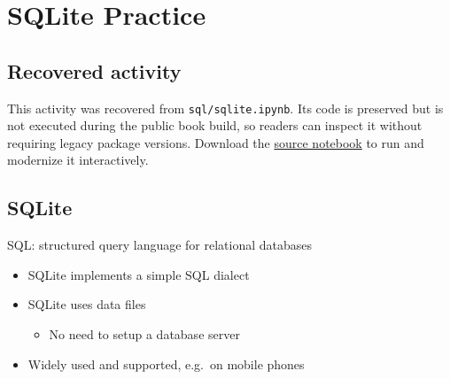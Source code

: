 \documentclass[
  letterpaper,
]{scrbook}
\providecommand{\tightlist}{%
  \setlength{\itemsep}{0pt}\setlength{\parskip}{0pt}}
\begin{document}
\chapter*{SQLite Practice}\label{ch-lab-sqlite}


\section*{Recovered activity}\label{sec-lab-sqlite}


\begin{tcolorbox}[enhanced jigsaw, arc=.35mm, bottomrule=.15mm, bottomtitle=1mm, breakable, colback=white, colbacktitle=quarto-callout-note-color!10!white, colframe=quarto-callout-note-color-frame, coltitle=black, left=2mm, leftrule=.75mm, opacityback=0, opacitybacktitle=0.6, rightrule=.15mm, title=\textcolor{quarto-callout-note-color}{\faInfo}\hspace{0.5em}{Historical source and execution note}, titlerule=0mm, toprule=.15mm, toptitle=1mm]

This activity was recovered from \texttt{sql/sqlite.ipynb}. Its code is
preserved but is not executed during the public book build, so readers
can inspect it without requiring legacy package versions. Download the
\href{../notebooks/sqlite.ipynb}{source notebook} to run and modernize
it interactively.

\end{tcolorbox}

\section*{SQLite}\label{sqlite}


SQL: structured query language for relational databases

\begin{itemize}
\tightlist
\item
  SQLite implements a simple SQL dialect
\item
  SQLite uses data files

  \begin{itemize}
  \tightlist
  \item
    No need to setup a database server
  \end{itemize}
\item
  Widely used and supported, e.g.~on mobile phones
\end{itemize}
\end{document}
